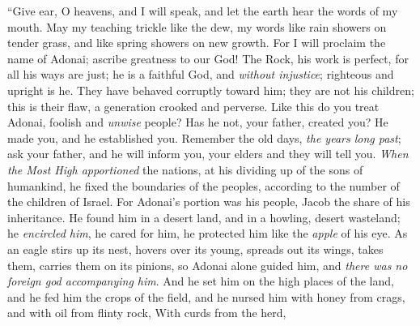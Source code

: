 \begin{biblechapter} %
 “Give ear, O heavens, and I will speak, 
and let the earth hear the words of my mouth.
\verse May my teaching trickle like the dew, 
my words like rain showers on tender grass, 
and like spring showers on new growth.
\verse For I will proclaim the name of Adonai; 
ascribe greatness to our God!
\verse The Rock, his work is perfect, 
for all his ways are just; 
he is a faithful God, and \textit{without injustice}; 
righteous and upright is he.
\verse They have behaved corruptly toward him; 
they are not his children; this is their flaw, 
a generation crooked and perverse.
\verse Like this do you treat Adonai, 
foolish and \textit{unwise} people? 
Has he not, your father, created you? 
He made you, and he established you.
\verse Remember the old days, \textit{the years long past}; 
ask your father, and he will inform you, 
your elders and they will tell you.
\verse \textit{When the Most High apportioned} the nations, 
at his dividing up of the sons of humankind, 
he fixed the boundaries of the peoples, 
according to the number of the children of Israel.
\verse For Adonai’s portion was his people, 
Jacob the share of his inheritance.
\verse He found him in a desert land, 
and in a howling, desert wasteland; 
he \textit{encircled him}, he cared for him, 
he protected him like the \textit{apple} of his eye.
\verse As an eagle stirs up its nest, 
hovers over its young, 
spreads out its wings, takes them, 
carries them on its pinions,
\verse so Adonai alone guided him, 
and \textit{there was no foreign god accompanying him}.
\verse And he set him on the high places of the land, 
and he fed him the crops of the field, 
and he nursed him with honey from crags, 
and with oil from flinty rock,
\verse With curds from the herd, 

\end{biblechapter}
